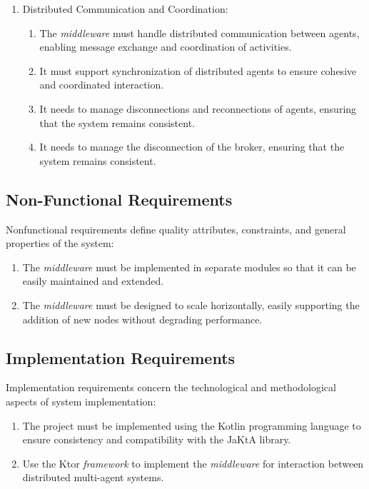 \begin{enumerate}
\begin{enumerate}
\begin{enumerate}
            \end{enumerate}
      \end{enumerate}
      \item Distributed Communication and Coordination:
      \begin{enumerate}
            \item The \textit{middleware} must handle distributed communication between agents, enabling message exchange and coordination of activities.
            \item It must support synchronization of distributed agents to ensure cohesive and coordinated interaction.
            \item It needs to manage disconnections and reconnections of agents, ensuring that the system remains consistent.
            \item It needs to manage the disconnection of the broker, ensuring that the system remains consistent.
      \end{enumerate}
\end{enumerate}
\subsection{Non-Functional Requirements}
Nonfunctional requirements define quality attributes, constraints, and general properties of the system:

\begin{enumerate}
      \item The \textit{middleware} must be implemented in separate modules so that it can be easily maintained and extended.
      \item The \textit{middleware} must be designed to scale horizontally, easily supporting the addition of new nodes without degrading performance.
\end{enumerate}

\subsection{Implementation Requirements}
Implementation requirements concern the technological and methodological aspects of system implementation:

\begin{enumerate}
      \item The project must be implemented using the Kotlin programming language to ensure consistency and compatibility with the JaKtA library.
      \item Use the Ktor \textit{framework} to implement the \textit{middleware} for interaction between distributed multi-agent systems.
\end{enumerate}